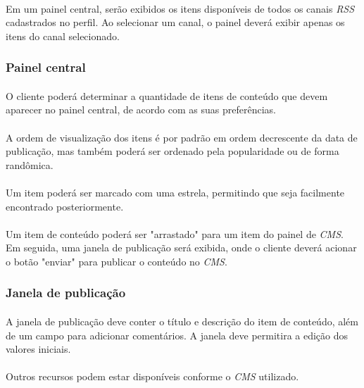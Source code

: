 \documentclass[a4paper,12pt]{article}
\def\cms{\emph{CMS}}
\def\rss{\emph{RSS}}
\begin{document}
\paragraph{}
Em um painel central, serão exibidos os itens disponíveis de todos os canais \rss{} cadastrados no perfil. Ao selecionar um canal, o painel deverá exibir apenas os itens do canal selecionado.

\subsubsection{Painel central}

\paragraph{}
O cliente poderá determinar a quantidade de itens de conteúdo que devem aparecer no painel central, de acordo com as suas preferências.
\paragraph{}
A ordem de visualização dos itens é por padrão em ordem decrescente da data de publicação, mas também poderá ser ordenado pela popularidade ou de forma randômica.
\paragraph{}
Um item poderá ser marcado com uma estrela, permitindo que seja facilmente encontrado posteriormente.
\paragraph{}
Um item de conteúdo poderá ser "arrastado" para um item do painel de \cms{}. Em seguida, uma janela de publicação será exibida, onde o cliente deverá acionar o botão "enviar" para publicar o conteúdo no \cms{}.

\subsubsection{Janela de publicação}
\paragraph{}
A janela de publicação deve conter o título e descrição do item de conteúdo, além de um campo para adicionar comentários. A janela deve permitira a edição dos valores iniciais.
\paragraph{}
Outros recursos podem estar disponíveis conforme o \cms{} utilizado.
\end{document}

